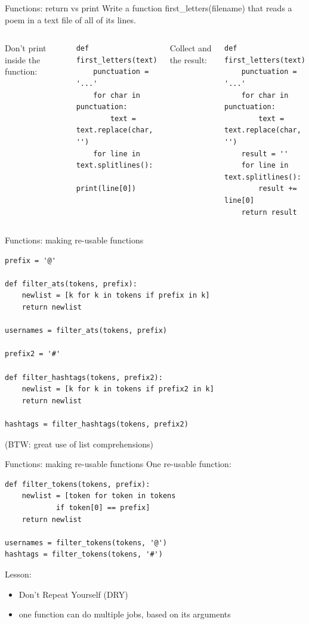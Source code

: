 \documentclass[aspectratio=169,usenames,dvipsnames]{beamer}
\begin{document}
\begin{frame}[fragile]{Functions: return vs print}
Write a function first\_letters(filename) that reads a poem in a text file
 of all of its lines.
\vspace{1em}
\begin{columns}
Don't print inside the function:
\begin{lstlisting}[style=smaller]
def first_letters(text):
    punctuation = '...'
    for char in punctuation:
        text = text.replace(char, '')
    for line in text.splitlines():
        print(line[0])
\end{lstlisting}
\pause{}
Collect and  the result: 
\begin{lstlisting}[style=smaller]
def first_letters(text):
    punctuation = '...'
    for char in punctuation:
        text = text.replace(char, '')
    result = ''
    for line in text.splitlines():
        result += line[0]
    return result
\end{lstlisting}
\end{columns}
\end{frame}

\begin{frame}[fragile]{Functions: making re-usable functions}
\begin{lstlisting}[style=smaller]
prefix = '@'

def filter_ats(tokens, prefix):
    newlist = [k for k in tokens if prefix in k]
    return newlist

usernames = filter_ats(tokens, prefix)

prefix2 = '#'

def filter_hashtags(tokens, prefix2):
    newlist = [k for k in tokens if prefix2 in k]
    return newlist

hashtags = filter_hashtags(tokens, prefix2)
\end{lstlisting}

(BTW: great use of list comprehensions)
\end{frame}

\begin{frame}[fragile]{Functions: making re-usable functions}
One re-usable function: 
\begin{lstlisting}[style=smaller]
def filter_tokens(tokens, prefix):
    newlist = [token for token in tokens
            if token[0] == prefix]
    return newlist

usernames = filter_tokens(tokens, '@')
hashtags = filter_tokens(tokens, '#')
\end{lstlisting}

Lesson:
    \begin{itemize}
        \item Don't Repeat Yourself (DRY)
        \item one function can do multiple jobs,
            based on its arguments
    \end{itemize}
\end{frame}
\end{document}

